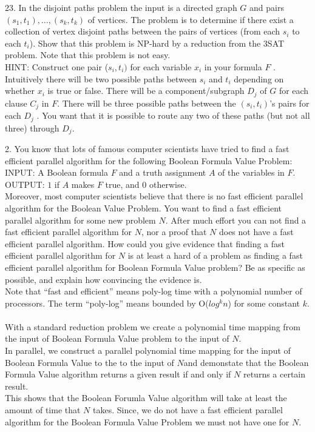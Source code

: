 \documentclass[10pt]{article}
\begin{document}
\newpage

23. In the disjoint paths problem the input is a directed graph $G$ and pairs $(s_1, t_1), \ldots, (s_k, t_k)$ of vertices.
The problem is to determine if there exist a collection of vertex disjoint paths between the pairs of
vertices (from each $s_i$ to each $t_i$). Show that this problem is NP-hard by a reduction from the 3SAT
problem. Note that this problem is not easy.\\
HINT: Construct one pair ($s_i, t_i)$ for each variable $x_i$ in your formula $F$ . Intuitively there will be
two possible paths between $s_i$ and $t_i$ depending on whether $x_i$ is true or false. There will be a
component/subgraph $D_j$ of $G$ for each clause $C_j$ in $F$. There will be three possible paths between the
$(s_i, t_i)$'s pairs for each $D_j$ . You want that it is possible to route any two of these paths (but not all
three) through $D_j$.
\newpage

2. You know that lots of famous computer scientists have tried to find a fast efficient parallel algorithm
for the following Boolean Formula Value Problem:\\
INPUT: A Boolean formula $F$ and a truth assignment $A$ of the variables in $F$.\\
OUTPUT: $1$ if $A$ makes $F$ true, and $0$ otherwise.\\
Moreover, most computer scientists believe that there is no fast efficient parallel algorithm for the
Boolean Value Problem. You want to find a fast efficient parallel algorithm for some new problem $N$.
After much effort you can not find a fast efficient parallel algorithm for $N$, nor a proof that $N$ does
not have a fast efficient parallel algorithm. How could you give evidence that finding a fast efficient
parallel algorithm for $N$ is at least a hard of a problem as finding a fast efficient parallel algorithm for
Boolean Formula Value problem? Be as specific as possible, and explain how convincing the evidence
is.\\
Note that ``fast and efficient'' means poly-log time with a polynomial number of processors. The term
``poly-log'' means bounded by O($log^kn$) for some constant $k$.\\
\\
With a standard reduction problem we create a polynomial time mapping from the input of Boolean Formula Value
problem to the input of $N$.\\
In parallel, we construct a parallel polynomial time mapping for the input of Boolean Formula Value to the
to the input of  $N$and demonstate that the Boolean Formula Value algorithm
returns a given result if and only if $N$ returns a certain result.\\
This shows that the Boolean Forumla Value algorithm will take at least the amount of time that $N$
takes. Since, we do not have a fast efficient parallel algorithm
for the Boolean Formula Value Problem we must not have one for $N$.
\newpage
\end{document}
